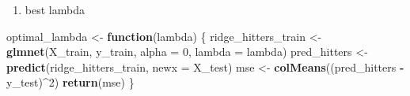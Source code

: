 \documentclass[
]{article}
\newenvironment{Shaded}{\begin{snugshade}}{\end{snugshade}}
\newcommand{\AttributeTok}[1]{\textcolor[rgb]{0.13,0.29,0.53}{#1}}
\newcommand{\ControlFlowTok}[1]{\textcolor[rgb]{0.13,0.29,0.53}{\textbf{#1}}}
\newcommand{\DecValTok}[1]{\textcolor[rgb]{0.00,0.00,0.81}{#1}}
\newcommand{\FunctionTok}[1]{\textcolor[rgb]{0.13,0.29,0.53}{\textbf{#1}}}
\newcommand{\NormalTok}[1]{#1}
\newcommand{\OtherTok}[1]{\textcolor[rgb]{0.56,0.35,0.01}{#1}}
\newcommand{\SpecialCharTok}[1]{\textcolor[rgb]{0.81,0.36,0.00}{\textbf{#1}}}
\providecommand{\tightlist}{%
  \setlength{\itemsep}{0pt}\setlength{\parskip}{0pt}}
\begin{document}
\begin{enumerate}
\def\labelenumi{\alph{enumi}.}
\setcounter{enumi}{4}
\tightlist
\item
  best lambda
\end{enumerate}

\begin{Shaded}
\begin{Highlighting}[]
\NormalTok{optimal\_lambda }\OtherTok{\textless{}{-}} \ControlFlowTok{function}\NormalTok{(lambda) \{}
\NormalTok{  ridge\_hitters\_train }\OtherTok{\textless{}{-}} \FunctionTok{glmnet}\NormalTok{(X\_train, y\_train, }\AttributeTok{alpha =} \DecValTok{0}\NormalTok{, }\AttributeTok{lambda =}\NormalTok{ lambda)}
\NormalTok{  pred\_hitters }\OtherTok{\textless{}{-}} \FunctionTok{predict}\NormalTok{(ridge\_hitters\_train, }\AttributeTok{newx =}\NormalTok{ X\_test)}
\NormalTok{  mse }\OtherTok{\textless{}{-}} \FunctionTok{colMeans}\NormalTok{((pred\_hitters }\SpecialCharTok{{-}}\NormalTok{ y\_test)}\SpecialCharTok{\^{}}\DecValTok{2}\NormalTok{)}
  \FunctionTok{return}\NormalTok{(mse)}
\NormalTok{\}}
\end{Highlighting}
\end{Shaded}
\end{document}
